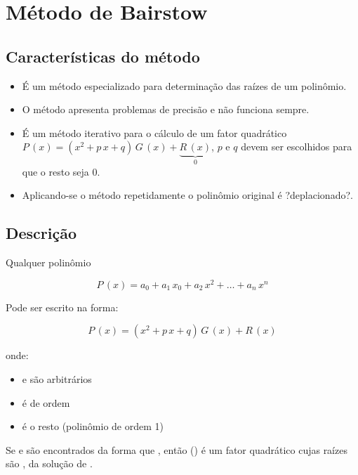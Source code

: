 \section{Método de Bairstow}

\subsection{Características do método}

\begin{itemize}
 \item É um método especializado para determinação das raízes de um polinômio.
 \item O método apresenta problemas de precisão e não funciona sempre.
 \item É um método iterativo para o cálculo de um fator quadrático $P\,(x) = (x^2 + p\,x + q) \, G\,(x) + \underbrace{R\,(x)}_{0}$, $p$ e $q$ devem ser escolhidos para que o resto seja $0$.
 \item Aplicando-se o método repetidamente o polinômio original é ?deplacionado?.
\end{itemize}

\subsection{Descrição}

Qualquer polinômio

\begin{equation}
 \label{cap1:sec7:eq1}
 P\,(x) = a_0 + a_1 \, x_0 + a_2 \, x^2 + \ldots + a_n \, x^n
\end{equation}
 
Pode ser escrito na forma:

\begin{equation}
 \label{cap1:sec7:eq2}
 P\,(x) = (x^2 + p\,x + q) \, G\,(x) + R\,(x)
\end{equation}

onde:

\begin{itemize}
 \item {} e  são arbitrários
 \item {} é de ordem 
 \item {} é o resto (polinômio de ordem 1)
\end{itemize}

Se  e  são encontrados da forma que , então () é um fator quadrático cujas raízes são ,  da solução de
.

